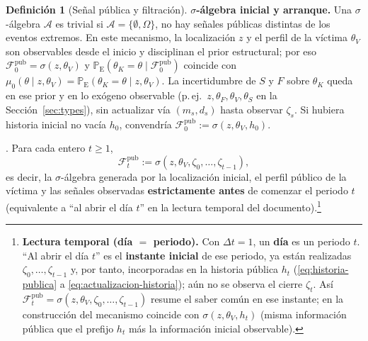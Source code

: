 \documentclass[12pt]{article}
\newenvironment{fnnote}{%
  \begin{minipage}[t]{\linewidth}%
  \sloppy
}{\end{minipage}}
\theoremstyle{definition}
\newtheorem{definition}[theorem]{Definición}
\theoremstyle{remark}
\newcommand{\ProbE}{\mathbb{P}_{\mathrm{E}}}
\newcommand{\1}{\mathbf{1}}
\begin{document}
\begin{definition}[Señal pública y filtración]
{\par\smallskip
\textbf{$\sigma$-álgebra inicial y arranque.} Una $\sigma$-álgebra $\mathcal{A}$ es trivial si $\mathcal{A}=\{\emptyset,\Omega\}$, no hay señales públicas distintas de los eventos extremos. En este mecanismo, la localización $z$ y el perfil de la víctima $\theta_V$ son observables desde el inicio y disciplinan el prior estructural; por eso $\mathcal{F}_0^{\mathrm{pub}}=\sigma(z, \theta_V)$ y $\ProbE(\theta_K=\theta \mid \mathcal{F}_0^{\mathrm{pub}})$ coincide con $\mu_0(\theta \mid z, \theta_V) = \ProbE(\theta_K=\theta \mid z, \theta_V)$. La incertidumbre de $S$ y $F$ sobre $\theta_K$ queda en ese prior y en lo exógeno observable \textup{(}p.\,ej.\ $z,\theta_F,\theta_V,\theta_S$ en la Sección~\ref{sec:types}\textup{)}, sin actualizar vía $(m_s,d_s)$ hasta observar $\zeta_s$. Si hubiera historia inicial no vacía $h_0$, convendría $\mathcal{F}_0^{\mathrm{pub}}:=\sigma(z, \theta_V, h_0)$.%
}.%
Para cada entero $t\ge 1$,
\[
\mathcal{F}_t^{\mathrm{pub}}:=\sigma(z,\theta_V,\zeta_0,\ldots,\zeta_{t-1}),
\]
es decir, la $\sigma$-álgebra generada por la localización inicial, el perfil público de la víctima y las señales observadas \textbf{estrictamente antes} de comenzar el periodo $t$ \textup{(}equivalente a ``al abrir el día $t$'' en la lectura temporal del documento\textup{)}.\footnote{\begin{fnnote}\textbf{Lectura temporal \textup{(}día $=$ periodo\textup{)}.} Con $\Delta t=1$, un \textbf{día} es un periodo $t$. ``Al abrir el día $t$'' es el \textbf{instante inicial} de ese periodo, ya están realizadas $\zeta_0,\ldots,\zeta_{t-1}$ y, por tanto, incorporadas en la historia pública $h_t$ \textup{(}\eqref{eq:historia-publica} a \eqref{eq:actualizacion-historia}\textup{)}; aún no se observa el cierre $\zeta_t$. Así $\mathcal{F}_t^{\mathrm{pub}}=\sigma(z,\theta_V,\zeta_0,\ldots,\zeta_{t-1})$ resume el saber común en ese instante; en la construcción del mecanismo coincide con $\sigma(z,\theta_V,h_t)$ \textup{(}misma información pública que el prefijo $h_t$ más la información inicial observable\textup{)}.\end{fnnote}}


\end{definition}
\end{document}
